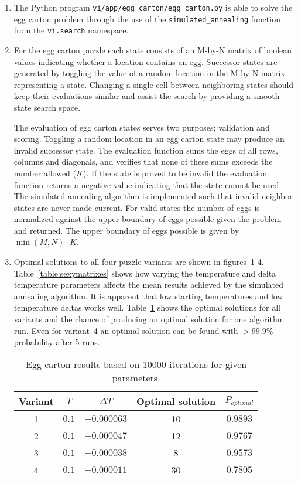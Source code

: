 \begin{enumerate}
\item
The Python program \texttt{vi/app/egg\_carton/egg\_carton.py} is able to solve the egg carton problem through the use of the \texttt{simulated\_annealing} function from the \texttt{vi.search} namespace.
\item

For the egg carton puzzle each state consists of an M-by-N matrix of boolean values indicating whether a location contains an egg. Successor states are generated by toggling the value of a random location in the M-by-N matrix representing a state. Changing a single cell between neighboring states should keep their evaluations similar and assist the search by providing a smooth state search space.

The evaluation of egg carton states serves two purposes; validation and scoring. Toggling a random location in an egg carton state may produce an invalid successor state. The evaluation function sums the eggs of all rows, columns and diagonals, and verifies that none of these sums exceeds the number allowed ($K$). If the state is proved to be invalid the evaluation function returns a negative value indicating that the state cannot be used. The simulated annealing algorithm is implemented such that invalid neighbor states are never made current. For valid states the number of eggs is normalized against the upper boundary of eggs possible given the problem and returned. The upper boundary of eggs possible is given by $\min(M, N) \cdot K$.

\item Optimal solutions to all four puzzle variants are shown in figures~1-4. Table~\ref{table:sexymatrixes} shows how varying the temperature and delta temperature parameters affects the mean results achieved by the simulated annealing algorithm. It is apparent that low starting temperatures and low temperature deltas works well. Table~\ref{table:eggresults} shows the optimal solutions for all variants and the chance of producing an optimal solution for one algorithm run. Even for variant~4 an optimal solution can be found with $>99.9\%$ probability after 5 runs.

\begin{table}
\centering
\begin{tabular}{ccccc}
\toprule
Variant & $T$ & $\Delta T$ & Optimal solution & $P_{\textit{optimal}}$ \\
\midrule
1 & $0.1$ & $-0.000063$ & 10 & $0.9893$ \\
2 & $0.1$ & $-0.000047$ & 12 & $0.9767$ \\
3 & $0.1$ & $-0.000038$ &  8 & $0.9573$ \\
4 & $0.1$ & $-0.000011$ & 30 & $0.7805$ \\
\bottomrule
\end{tabular}
\caption{Egg carton results based on 10000 iterations for given parameters.}
\label{table:eggresults}
\end{table}


\end{enumerate}
